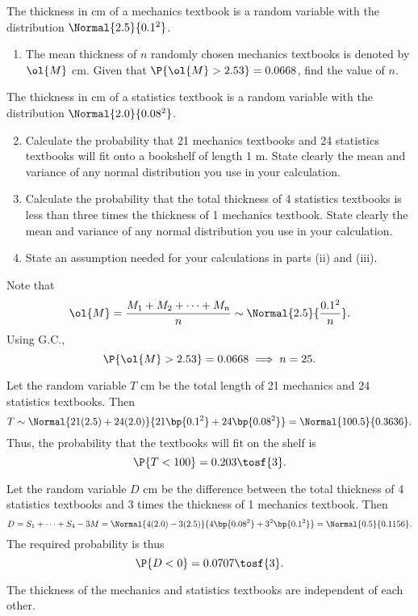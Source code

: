\begin{problem}
    The thickness in cm of a mechanics textbook is a random variable with the distribution $\Normal{2.5}{0.1^2}$.

    \begin{enumerate}
        \item The mean thickness of $n$ randomly chosen mechanics textbooks is denoted by $\ol{M}$ cm. Given that $\P{\ol{M} > 2.53} = 0.0668$, find the value of $n$.
    \end{enumerate}

    The thickness in cm of a statistics textbook is a random variable with the distribution $\Normal{2.0}{0.08^2}$.

    \begin{enumerate}
        \setcounter{enumi}{1}
        \item Calculate the probability that 21 mechanics textbooks and 24 statistics textbooks will fit onto a bookshelf of length 1 m. State clearly the mean and variance of any normal distribution you use in your calculation.
        \item  Calculate the probability that the total thickness of 4 statistics textbooks is less than three times the thickness of 1 mechanics textbook. State clearly the mean and variance of any normal distribution you use in your calculation.
        \item State an assumption needed for your calculations in parts (ii) and (iii).
    \end{enumerate}
\end{problem}
\begin{solution}
    \begin{ppart}
        Note that \[\ol{M} = \frac{M_1 + M_2 + \dots + M_n}{n} \sim \Normal{2.5}{\frac{0.1^2}{n}}.\] Using G.C., \[\P{\ol{M} > 2.53} = 0.0668 \implies n = 25.\]
    \end{ppart}
    \begin{ppart}
        Let the random variable $T$ cm be the total length of 21 mechanics and 24 statistics textbooks. Then \[T \sim \Normal{21(2.5) + 24(2.0)}{21\bp{0.1^2} + 24\bp{0.08^2}} = \Normal{100.5}{0.3636}.\] Thus, the probability that the textbooks will fit on the shelf is \[\P{T < 100} = 0.203 \tosf{3}.\]
    \end{ppart}
    \begin{ppart}
        Let the random variable $D$ cm be the difference between the total thickness of 4 statistics textbooks and 3 times the thickness of 1 mechanics textbook. Then \[D = S_1 + \dots + S_4 - 3 M = \Normal{4(2.0) - 3(2.5)}{4\bp{0.08^2} + 3^2\bp{0.1^2}} = \Normal{0.5}{0.1156}.\] The required probability is thus \[\P{D < 0} = 0.0707 \tosf{3}.\]
    \end{ppart}
    \begin{ppart}
        The thickness of the mechanics and statistics textbooks are independent of each other.
    \end{ppart}
\end{solution}

